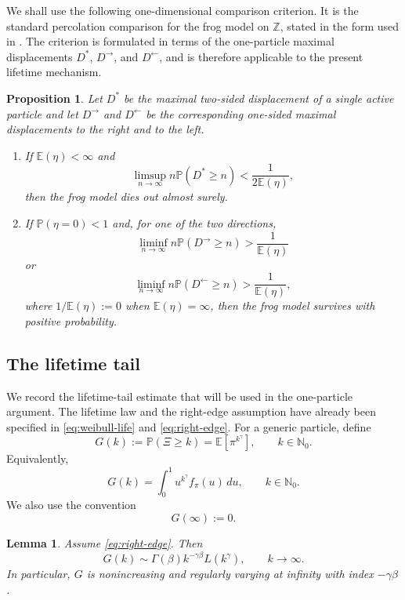 \documentclass[reqno,final,11pt]{amsart}
\newcommand{\Nzero}{\mathbb N_0}
\newcommand{\E}{\mathbb E}
\newcommand{\Pbb}{\mathbb P}
\newcommand{\dd}{\,d}
\theoremstyle{plain}
\newtheorem{proposition}[theorem]{Proposition}
\newtheorem{lemma}[theorem]{Lemma}
\theoremstyle{definition}
\theoremstyle{remark}
\numberwithin{equation}{section}
\begin{document}
We shall use the following one-dimensional comparison criterion. It is the
standard percolation comparison for the frog model on \(\mathbb Z\), stated
in the form used in \cite[Proposition~1.2]{CarvalhoMachado}. The criterion is
formulated in terms of the one-particle maximal displacements \(D^*\),
\(D^\to\), and \(D^\leftarrow\), and is therefore applicable to the present
lifetime mechanism.



 \begin{proposition}\label{prop:frog-criterion}
 Let \(D^*\) be the maximal two-sided displacement of a single active particle
 and let \(D^\to\) and \(D^\leftarrow\) be the corresponding one-sided maximal
 displacements to the right and to the left.
 \begin{enumerate}[label=\textup{(\roman*)}]
 \item If \(\E(\eta)<\infty\) and
 \[
   \limsup_{n\to\infty} n\Pbb(D^*\ge n)
   <
   \frac{1}{2\E(\eta)},
 \]
 then the frog model dies out almost surely.
 \item If \(\Pbb(\eta=0)<1\) and, for one of the two directions,
 \[
   \liminf_{n\to\infty} n\Pbb(D^\to\ge n)
   >
   \frac{1}{\E(\eta)}
\] or \[
   \liminf_{n\to\infty} n\Pbb(D^\leftarrow\ge n)
   >
   \frac{1}{\E(\eta)},
 \]
 where \(1/\E(\eta):=0\) when \(\E(\eta)=\infty\), then the frog model survives
 with positive probability.
 \end{enumerate}
 \end{proposition}


\subsection{The lifetime tail}\label{sec:lifetime}

We record the lifetime-tail estimate that will be used in the one-particle
argument. The lifetime law and the right-edge assumption have already been
specified in \eqref{eq:weibull-life} and \eqref{eq:right-edge}. For a generic
particle, define
\[
  G(k):=\Pbb(\Xi\ge k)
  =
  \E[\pi^{k^\gamma}],
  \qquad k\in\Nzero.
\]
Equivalently,
\[
  G(k)=\int_0^1 u^{k^\gamma}f_\pi(u)\dd u,
  \qquad k\in\Nzero.
\]
We also use the convention
\[
  G(\infty):=0.
\]

\begin{lemma}\label{lem:lifetime-tail}
Assume \eqref{eq:right-edge}. Then
\[
  G(k)
  \sim
  \Gamma(\beta)k^{-\gamma\beta}L(k^\gamma),
  \qquad k\to\infty.
\]
In particular, \(G\) is nonincreasing and regularly varying at infinity with
index \(-\gamma\beta\).
\end{lemma}
\end{document}
